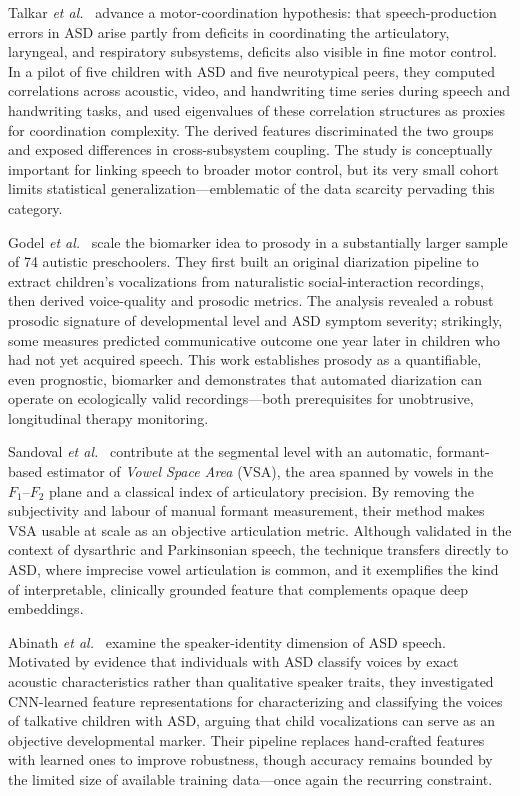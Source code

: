 \documentclass[conference]{IEEEtran}
\begin{document}
Talkar \textit{et al.}~\cite{ref6} advance a motor-coordination hypothesis: that speech-production errors in ASD arise partly from deficits in coordinating the articulatory, laryngeal, and respiratory subsystems, deficits also visible in fine motor control. In a pilot of five children with ASD and five neurotypical peers, they computed correlations across acoustic, video, and handwriting time series during speech and handwriting tasks, and used eigenvalues of these correlation structures as proxies for coordination complexity. The derived features discriminated the two groups and exposed differences in cross-subsystem coupling. The study is conceptually important for linking speech to broader motor control, but its very small cohort limits statistical generalization---emblematic of the data scarcity pervading this category.

Godel \textit{et al.}~\cite{ref7} scale the biomarker idea to prosody in a substantially larger sample of 74 autistic preschoolers. They first built an original diarization pipeline to extract children's vocalizations from naturalistic social-interaction recordings, then derived voice-quality and prosodic metrics. The analysis revealed a robust prosodic signature of developmental level and ASD symptom severity; strikingly, some measures predicted communicative outcome one year later in children who had not yet acquired speech. This work establishes prosody as a quantifiable, even prognostic, biomarker and demonstrates that automated diarization can operate on ecologically valid recordings---both prerequisites for unobtrusive, longitudinal therapy monitoring.

Sandoval \textit{et al.}~\cite{ref8} contribute at the segmental level with an automatic, formant-based estimator of \emph{Vowel Space Area} (VSA), the area spanned by vowels in the $F_1$--$F_2$ plane and a classical index of articulatory precision. By removing the subjectivity and labour of manual formant measurement, their method makes VSA usable at scale as an objective articulation metric. Although validated in the context of dysarthric and Parkinsonian speech, the technique transfers directly to ASD, where imprecise vowel articulation is common, and it exemplifies the kind of interpretable, clinically grounded feature that complements opaque deep embeddings.

Abinath \textit{et al.}~\cite{ref9} examine the speaker-identity dimension of ASD speech. Motivated by evidence that individuals with ASD classify voices by exact acoustic characteristics rather than qualitative speaker traits, they investigated CNN-learned feature representations for characterizing and classifying the voices of talkative children with ASD, arguing that child vocalizations can serve as an objective developmental marker. Their pipeline replaces hand-crafted features with learned ones to improve robustness, though accuracy remains bounded by the limited size of available training data---once again the recurring constraint.
\end{document}
